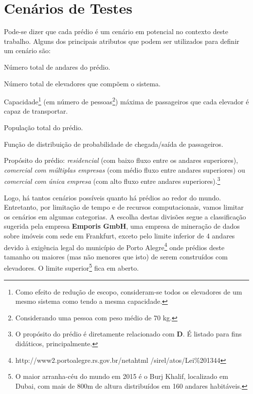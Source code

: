 \section{\label{section:scenarios}Cenários de Testes}

Pode-se dizer que cada prédio é um cenário em potencial no contexto deste
trabalho. Alguns dos principais atributos que podem ser utilizados para definir
um cenário são:

\begin{description}[leftmargin=!,labelwidth=\widthof{\bfseries Pu}]
  \item[F]
  Número total de andares do prédio.
  \item[E]
  Número total de elevadores que compõem o sistema.
  \item[C]
  Capacidade\footnote{Como efeito de redução de escopo, consideram-se todos os
  elevadores de um mesmo sistema como tendo a mesma capacidade.} (em número de
  pessoas\footnote{Considerando uma pessoa com peso médio de 70 kg.}) máxima de
  passageiros que cada elevador é capaz de transportar.
  \item[P]
  População total do prédio.
  \item[D]
  Função de distribuição de probabilidade de chegada/saída de passageiros.
  \item[Pu]
  Propósito do prédio: \textit{residencial} (com baixo fluxo entre os andares superiores), \textit{comercial com múltiplas empresas} (com médio fluxo entre andares superiores) ou \textit{comercial
    com única empresa} (com alto fluxo entre andares superiores).\footnote{O
    propósito do prédio é diretamente relacionado com \textbf{D}. É listado para
  fins didáticos, principalmente.}
\end{description}

Logo, há tantos cenários possíveis quanto há prédios ao redor do mundo.
Entretanto, por limitação de tempo e de recursos computacionais, vamos limitar
os cenários em algumas categorias. A escolha destas divisões segue a
classificação\cite{Emporis15} sugerida pela empresa \textbf{Emporis GmbH}, uma empresa de
mineração de dados sobre imóveis com sede em Frankfurt, exceto pelo limite
inferior de 4 andares devido à exigência legal do município de Porto
Alegre\footnote{http://www2.portoalegre.rs.gov.br/netahtml
/sirel/atos/Lei\%201344} onde prédios deste tamanho ou maiores (mas não menores
que isto) de serem construídos com elevadores. O limite superior\footnote{O
maior arranha-céu do mundo em 2015 é o Burj Khalif, localizado em Dubai, com
mais de 800m de altura distribuídos em 160 andares habitáveis.} fica em aberto.

